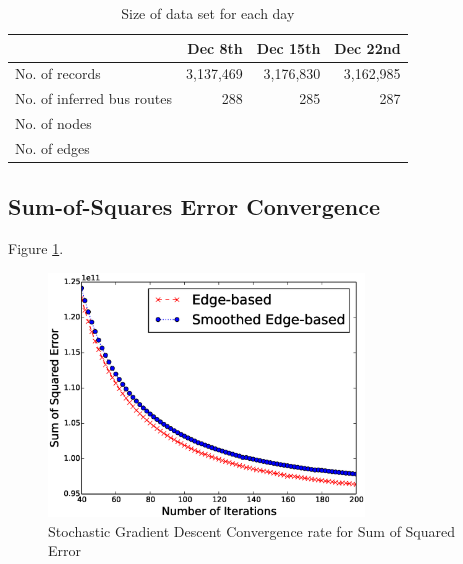\documentclass{sig-alternate}
\begin{document}
\begin{table}[htb]
	\centering
	\caption{Size of data set for each day}
	\label{tbl:statistics}
	\begin{tabular}{|p{1in}|r|r|r|}
		\hline
			& Dec 8th & Dec 15th & Dec 22nd \\
		\hline
		No. of records & 3,137,469 & 3,176,830 & 3,162,985\\
		\hline
		No. of inferred bus routes & 288 & 285 & 287\\
		\hline
		No. of nodes & & &\\
		\hline
		No. of edges & & &\\
		\hline
	\end{tabular}
\end{table}



\subsection{Sum-of-Squares Error Convergence}
Figure \ref{fig:convergence}.
\begin{figure}[htb]
	\centering
	\includegraphics[width=3.3in]{convergence}
	\caption{Stochastic Gradient Descent Convergence rate for Sum of Squared Error}
	\label{fig:convergence}
\end{figure}
\end{document}
